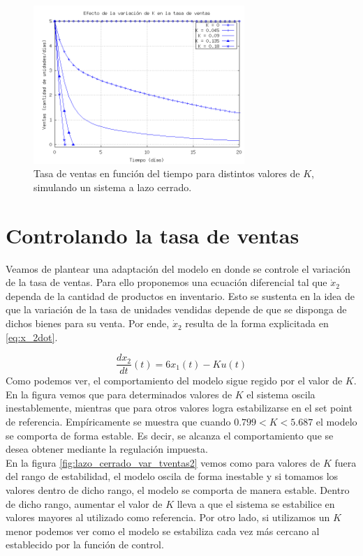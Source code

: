 \documentclass{sig-alternate}
\begin{document}
\begin{figure}[h]
\begin{center}
\includegraphics[width=8cm]{../src/k_plot3.png}
\caption{\label{fig:lazo_cerrado_var_tventas1}Tasa de ventas en función del tiempo para distintos valores de $K$, simulando un sistema
a lazo cerrado.}
\end{center}
\end{figure}

\section{Controlando la tasa de ventas}
\label{salesrate_control_section}
Veamos de plantear una adaptación del modelo en donde se controle el variación de la tasa de ventas. Para ello proponemos una ecuación diferencial
tal que $\dot{x}_{2}$ dependa de la cantidad de productos en inventario. Esto se sustenta en la idea de que la variación de la tasa de unidades
vendidas depende de que se disponga de dichos bienes para su venta. Por ende, $\dot{x}_{2}$ resulta de la forma explicitada en \eqref{eq:x_2dot}.

\begin{equation}
 \label{eq:x_2dot}
 \frac{dx_{2}}{dt}(t) = 6x_1(t) - Ku(t)
\end{equation}
Como podemos ver, el comportamiento del modelo sigue regido por el valor de $K$. En la figura vemos que para determinados valores de $K$ el sistema
oscila inestablemente, mientras que para otros valores logra estabilizarse en el set point de referencia. Empíricamente se muestra que cuando $0.799 < K < 5.687$ el modelo se comporta de forma estable. 
Es decir, se alcanza el comportamiento que se desea obtener mediante la regulación impuesta.\\
En la figura \ref{fig:lazo_cerrado_var_tventas2} vemos como para valores de $K$ fuera del rango de estabilidad, el modelo oscila de
forma inestable y si tomamos los valores dentro de dicho rango, el modelo se comporta de manera estable. Dentro de dicho rango, aumentar el 
valor de $K$ lleva a que el sistema se estabilice en valores mayores al utilizado como referencia. Por otro lado, si utilizamos un $K$ menor podemos ver como el 
modelo se estabiliza cada vez más cercano al establecido por la función de control.
\end{document}
